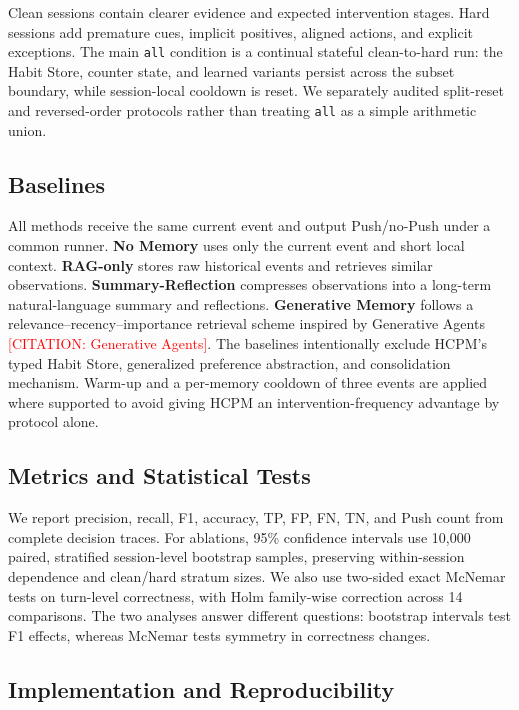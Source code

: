 \documentclass[sigconf,anonymous,review]{acmart}
\newcommand{\citetodo}[1]{\textcolor{red}{[CITATION: #1]}}
\newcommand{\system}{HCPM}
\begin{document}
Clean sessions contain clearer evidence and expected intervention stages.
Hard sessions add premature cues, implicit positives, aligned actions, and explicit exceptions.
The main \texttt{all} condition is a continual stateful clean-to-hard run: the Habit Store, counter state, and learned variants persist across the subset boundary, while session-local cooldown is reset.
We separately audited split-reset and reversed-order protocols rather than treating \texttt{all} as a simple arithmetic union.

\subsection{Baselines}

All methods receive the same current event and output Push/no-Push under a common runner.
\textbf{No Memory} uses only the current event and short local context.
\textbf{RAG-only} stores raw historical events and retrieves similar observations.
\textbf{Summary-Reflection} compresses observations into a long-term natural-language summary and reflections.
\textbf{Generative Memory} follows a relevance--recency--importance retrieval scheme inspired by Generative Agents \citetodo{Generative Agents}.
The baselines intentionally exclude \system{}'s typed Habit Store, generalized preference abstraction, and consolidation mechanism.
Warm-up and a per-memory cooldown of three events are applied where supported to avoid giving \system{} an intervention-frequency advantage by protocol alone.

\subsection{Metrics and Statistical Tests}

We report precision, recall, F1, accuracy, TP, FP, FN, TN, and Push count from complete decision traces.
For ablations, 95\% confidence intervals use 10,000 paired, stratified session-level bootstrap samples, preserving within-session dependence and clean/hard stratum sizes.
We also use two-sided exact McNemar tests on turn-level correctness, with Holm family-wise correction across 14 comparisons.
The two analyses answer different questions: bootstrap intervals test F1 effects, whereas McNemar tests symmetry in correctness changes.

\subsection{Implementation and Reproducibility}
\end{document}
